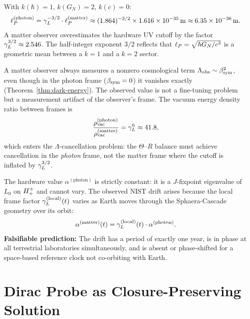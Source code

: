 \begin{theorem}\label{thm:planck-photon}
With $k(\hbar)=1$, $k(G_N)=2$, $k(c)=0$:
\[
  \ell_P^{(\mathrm{photon})}
  = \gamma_L^{-3/2}\cdot\ell_P^{(\mathrm{matter})}
  \approx (1.864)^{-3/2}\times 1.616\times10^{-35}\,\mathrm{m}
  \approx 6.35\times10^{-36}\,\mathrm{m}.
\]
A matter observer overestimates the hardware UV cutoff by the factor
$\gamma_L^{3/2}\approx 2.546$.
The half-integer exponent $3/2$ reflects that $\ell_P=\sqrt{\hbar G_N/c^3}$
is a geometric mean between a $k=1$ and a $k=2$ sector.
\end{theorem}

\begin{corollary}
A matter observer always measures a nonzero cosmological term
$\Lambda_{\mathrm{obs}}\sim\beta_{\mathrm{sym}}^2$, even though in the photon frame
($\beta_{\mathrm{sym}}=0$) it vanishes exactly
(Theorem~\ref{thm:dark-energy}).
The observed value is not a fine-tuning problem but a measurement
artifact of the observer's frame.
The vacuum energy density ratio between frames is
\[
  \frac{\rho_{\mathrm{vac}}^{(\mathrm{photon})}}
       {\rho_{\mathrm{vac}}^{(\mathrm{matter})}}
  = \gamma_L^6\approx 41.8,
\]
which enters the $\Lambda$-cancellation problem: the $\Theta$--$R$
balance must achieve cancellation in the \emph{photon} frame, not the
matter frame where the cutoff is inflated by $\gamma_L^{3/2}$.
\end{corollary}

\begin{corollary}
The hardware value $\alpha^{(\mathrm{photon})}$ is strictly constant:
it is a $J$-fixpoint eigenvalue of $L_0$ on $H^+_+$ and cannot vary.
The observed NIST drift arises because the local frame factor
$\gamma_L^{(\mathrm{local})}(t)$ varies as Earth moves through the
Sphaera-Cascade geometry over its orbit:
\[
  \alpha^{(\mathrm{matter})}(t)
  = \gamma_L^{(\mathrm{local})}(t)\cdot\alpha^{(\mathrm{photon})}.
\]
\textbf{Falsifiable prediction:} The drift has a period of exactly one
year, is in phase at all terrestrial laboratories simultaneously, and is
absent or phase-shifted for a space-based reference clock not co-orbiting
with Earth.
\end{corollary}


\section{Dirac Probe as Closure-Preserving Solution}
\label{sec:dirac-probe}

